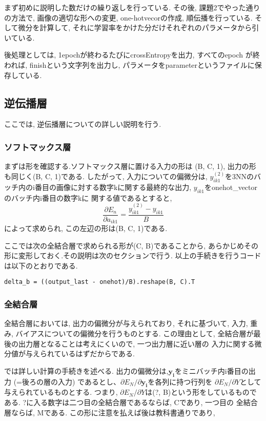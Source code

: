 \documentclass[a4paper,11pt]{jsarticle}
\begin{document}
まず初めに説明した数だけの繰り返しを行っている.
その後, 課題2でやった通りの方法で, 画像の適切な形への変更, 
one-hotvecorの作成, 順伝播を行っている. そして微分を計算して, 
それに学習率をかけた分だけそれぞれのパラメータから引いている.
\par 
後処理としては, 1epochが終わるたびにcrossEntropyを出力, すべてのepoch
が終われば, finishという文字列を出力し, パラメータをparameterというファイルに保存している.

\subsection*{逆伝播層}
ここでは, 逆伝播層についての詳しい説明を行う.
\subsubsection*{ソフトマックス層}
まずは形を確認する.ソフトマックス層に置ける入力の形は
(B, C, 1), 出力の形も同じく(B, C, 1)である. したがって, 入力についての偏微分は, 
$y_{ik1}^{(2)}$を3NNのバッチ内のi番目の画像に対する数字kに関する最終的な出力, $y_{ik1}$をonehot\_vectorのバッチ内i番目の数字kに
関する値であるとすると,
$$\frac{\partial E_n}{\partial a_{ik1}} = \frac{y_{ik1}^{(2)} - y_{ik1}}{B}$$
によって求められ, この左辺の形は(B, C, 1)である.
\par
ここでは次の全結合層で求められる形が(C, B)であることから,
あらかじめその形に変形しておく.その説明は次のセクションで行う.
以上の手続きを行うコードは以下のとおりである.
\begin{lstlisting}[caption=SoftMax]
  delta_b = ((output_last - onehot)/B).reshape(B, C).T
\end{lstlisting}

\subsubsection*{全結合層}
全結合層においては, 出力の偏微分が与えられており, それに基づいて, 
入力, 重み, バイアスについての偏微分を行うものとする. この理由として,
全結合層が最後の出力層となることは考えにくいので, 一つ出力層に近い層の
入力に関する微分値が与えられているはずだからである.\par 
では詳しい計算の手続きを述べる.
出力の偏微分は,$\bm{y_i}$をミニバッチ内i番目の出力
(=後ろの層の入力)
であるとし、$\partial E_N / \partial \bm{y_i}$を各列に持つ行列を
$\partial E_N / \partial Y$として与えられているものとする.
つまり, $\partial E_N / \partial Y$は(?, B)という形をしているものである.
?に入る数字は二つ目の全結合層であるならば, Cであり, 一つ目の
全結合層ならば, Mである. この形に注意を払えば後は教科書通りであり,
\end{document}
